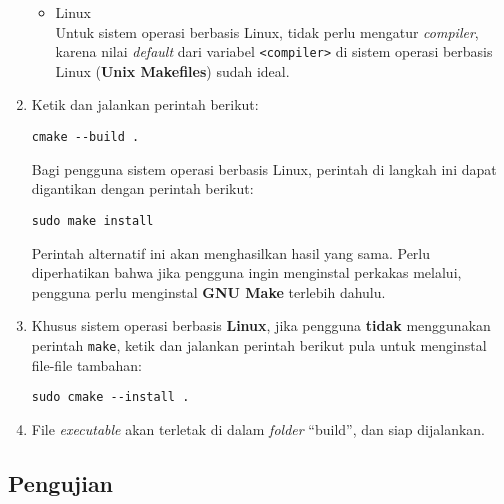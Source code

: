 \begin{enumerate}
\begin{itemize}
		\item Linux \\
		Untuk sistem operasi berbasis Linux, tidak perlu mengatur \textit{compiler}, karena nilai \textit{default} dari variabel \verb|<compiler>| di sistem operasi berbasis Linux (\textbf{Unix Makefiles}) sudah ideal.
	\end{itemize}
	
	\item Ketik dan jalankan perintah berikut:
	\begin{verbatim}
cmake --build .
	\end{verbatim}
	Bagi pengguna sistem operasi berbasis Linux, perintah di langkah ini dapat digantikan dengan perintah berikut:
	\begin{verbatim}
sudo make install
	\end{verbatim}
	Perintah alternatif ini akan menghasilkan hasil yang sama. Perlu diperhatikan bahwa jika pengguna ingin menginstal perkakas melalui, pengguna perlu menginstal \textbf{GNU Make} terlebih dahulu.
	
	\item Khusus sistem operasi berbasis \textbf{Linux}, jika pengguna \textbf{tidak} menggunakan perintah \verb|make|, ketik dan jalankan perintah berikut pula untuk menginstal file-file tambahan:
		\begin{verbatim}
sudo cmake --install .
	\end{verbatim}
	\item File \textit{executable} akan terletak di dalam \textit{folder} ``build'', dan siap dijalankan.
\end{enumerate}

\subsection{Pengujian}
\label{sec:testing-experiments}